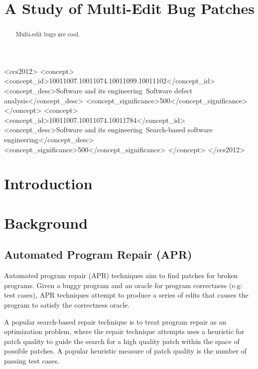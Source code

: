 \documentclass[sigconf, timestamp-false, anonymous=true]{acmart}
\begin{document}
\title{A Study of Multi-Edit Bug Patches}


\begin{abstract}
	Multi-edit bugs are cool.
\end{abstract}

\begin{CCSXML}
<ccs2012>
<concept>
<concept_id>10011007.10011074.10011099.10011102</concept_id>
<concept_desc>Software and its engineering~Software defect analysis</concept_desc>
<concept_significance>500</concept_significance>
</concept>
<concept>
<concept_id>10011007.10011074.10011784</concept_id>
<concept_desc>Software and its engineering~Search-based software engineering</concept_desc>
<concept_significance>500</concept_significance>
</concept>
</ccs2012>
\end{CCSXML}



\maketitle

\section{Introduction}

\section{Background}
\subsection{Automated Program Repair (APR)}
Automated program repair (APR) techniques aim to find patches for broken programs. 
Given a buggy program and an oracle for program correctness (e.g: test cases), APR 
techniques attempt to produce a series of edits that causes the program to satisfy the 
correctness oracle. 

A popular search-based repair technique is to treat program repair as an optimization 
problem, where the repair technique attempts uses a heuristic for patch quality to guide 
the search for a high quality patch within the space of possible patches. A popular heuristic
measure of patch quality is the number of passing test cases.
\end{document}
